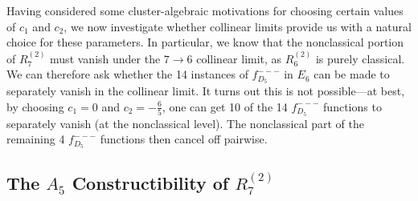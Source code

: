 \documentclass[12pt]{article}
\def\pdfeq#1{\texorpdfstring{$#1$}{a}}
\begin{document}
Having considered some cluster-algebraic motivations for choosing certain values of $c_1$ and $c_2$, we now investigate whether collinear limits provide us with a natural choice for these parameters. In particular, we know that the nonclassical portion of $R^{(2)}_7$ must vanish under the $7\to6$ collinear limit, as $R^{(2)}_6$ is purely classical. We can therefore ask whether the 14 instances of $f_{D_5}^{---}$ in $E_6$ can be made to separately vanish in the collinear limit. It turns out this is not possible---at best, by choosing $c_1 = 0$ and $c_2 = -\frac{6}{5}$, one can get 10 of the 14 $f_{D_5}^{---}$ functions to separately vanish (at the nonclassical level). The nonclassical part of the remaining 4 $f_{D_5}^{---}$ functions then cancel off pairwise. 

\subsection{The \pdfeq{A_5} Constructibility of \pdfeq{R^{(2)}_7}}\label{sec:a5-func}
\end{document}
